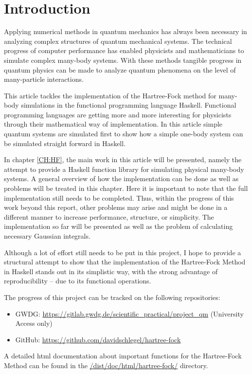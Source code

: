 \documentclass[twoside,        %
			   12pt,			%
               BCOR10mm,       %
               ngerman,english  %
               ]{scrartcl}
\begin{document}


\section{Introduction}
Applying numerical methods in quantum mechanics has always been necessary in analyzing complex structures of quantum mechanical systems. The technical progress of computer performance has enabled physicists and mathematicians to simulate complex many-body systems. With these methods tangible progress in quantum physics can be made to analyze quantum phenomena on the level of many-particle interactions. 

This article tackles the implementation of the Hartree-Fock method for many-body simulations in the functional programming language Haskell. Functional programming languages are getting more and more interesting for physicists through their mathematical way of implementation. In this article simple quantum systems are simulated first to show how a simple one-body system can be simulated straight forward in Haskell.

In chapter \ref{CH:HF}, the main work in this article will be presented, namely the attempt to provide a Haskell function library for simulating physical many-body systems. A general overview of how the implementation can be done as well as problems will be treated in this chapter. Here it is important to note that the full implementation still needs to be completed. Thus, within the progress of this work beyond this report, other problems may arise and might be done in a different manner to increase performance, structure, or simplicity. The implementation so far will be presented as well as the problem of calculating necessary Gaussian integrals.

Although a lot of effort still needs to be put in this project, I hope to provide a structural attempt to show that the implementation of the Hartree-Fock Method in Haskell stands out in its simplistic way, with the strong advantage of reproducibility -- due to its functional operations.

The progress of this project can be tracked on the following repositories:
\begin{itemize}
\item GWDG: \url{https://gitlab.gwdg.de/scientific_practical/project_qm} (University Access only)

\item GitHub: \url{https://github.com/davidschlegel/hartree-fock}
\end{itemize}
A detailed html documentation about important functions for the Hartree-Fock Method can be found in the \url{/dist/doc/html/hartree-fock/} directory.
\end{document}
